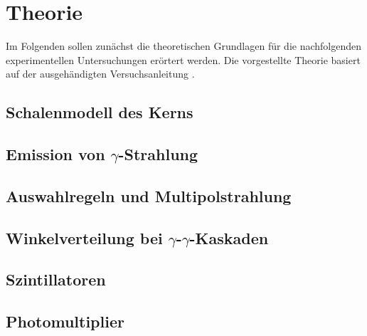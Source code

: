 \section{Theorie}
	
Im Folgenden sollen zunächst die theoretischen Grundlagen für die nachfolgenden experimentellen Untersuchungen erörtert werden.
Die vorgestellte Theorie basiert auf der ausgehändigten Versuchsanleitung \cite{wwu}.

\subsection{Schalenmodell des Kerns}

\subsection{Emission von $\gamma$-Strahlung}

\subsection{Auswahlregeln und Multipolstrahlung}

\subsection{Winkelverteilung bei $\gamma$-$\gamma$-Kaskaden}

\subsection{Szintillatoren}

\subsection{Photomultiplier}